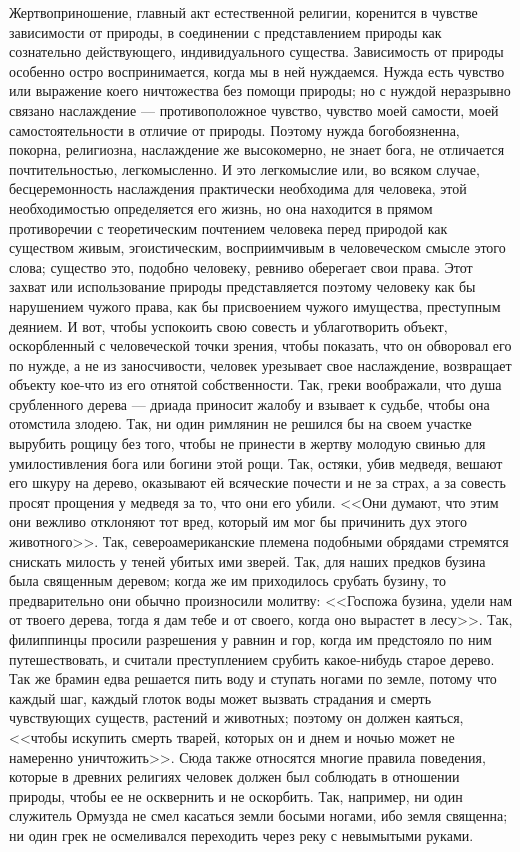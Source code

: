\documentclass[12pt,oneside]{book}
\begin{document}
Жертвоприношение, главный акт естественной религии, коренится в чувстве зависимости от природы, в соединении с представлением природы как сознательно действующего, индивидуального существа. Зависимость от природы особенно остро воспринимается, когда мы в ней нуждаемся. Нужда есть чувство или выражение коего ничтожества без помощи природы; но с нуждой неразрывно связано наслаждение --- противоположное чувство, чувство моей самости, моей самостоятельности в отличие от природы. Поэтому нужда богобоязненна, покорна, религиозна, наслаждение же высокомерно, не знает бога, не отличается почтительностью, легкомысленно. И это легкомыслие или, во всяком случае, бесцеремонность наслаждения практически необходима для человека, этой необходимостью определяется его жизнь, но она находится в прямом противоречии с теоретическим почтением человека перед природой как существом живым, эгоистическим, восприимчивым в человеческом смысле этого слова; существо это, подобно человеку, ревниво оберегает свои права. Этот захват или использование природы представляется поэтому человеку как бы нарушением чужого права, как бы присвоением чужого имущества, преступным деянием. И вот, чтобы успокоить свою совесть и ублаготворить объект, оскорбленный с человеческой точки зрения, чтобы показать, что он обворовал его по нужде, а не из заносчивости, человек урезывает свое наслаждение, возвращает объекту кое-что из его отнятой собственности. Так, греки воображали, что душа срубленного дерева --- дриада приносит жалобу и взывает к судьбе, чтобы она отомстила злодею. Так, ни один римлянин не решился бы на своем участке вырубить рощицу без того, чтобы не принести в жертву молодую свинью для умилостивления бога или богини этой рощи. Так, остяки, убив медведя, вешают его шкуру на дерево, оказывают ей всяческие почести и не за страх, а за совесть просят прощения у медведя за то, что они его убили. <<Они думают, что этим они вежливо отклоняют тот вред, который им мог бы причинить дух этого животного>>. Так, североамериканские племена подобными обрядами стремятся снискать милость у теней убитых ими зверей. Так, для наших предков бузина была священным деревом; когда же им приходилось срубать бузину, то предварительно они обычно произносили молитву: <<Госпожа бузина, удели нам от твоего дерева, тогда я дам тебе и от своего, когда оно вырастет в лесу>>. Так, филиппинцы просили разрешения у равнин и гор, когда им предстояло по ним путешествовать, и считали преступлением срубить какое-нибудь старое дерево. Так же брамин едва решается пить воду и ступать ногами по земле, потому что каждый шаг, каждый глоток воды может вызвать страдания и смерть чувствующих существ, растений и животных; поэтому он должен каяться, <<чтобы искупить смерть тварей, которых он и днем и ночью может не намеренно уничтожить>>. Сюда также относятся многие правила поведения, которые в древних религиях человек должен был соблюдать в отношении природы, чтобы ее не осквернить и не оскорбить. Так, например, ни один служитель Ормузда не смел касаться земли босыми ногами, ибо земля священна; ни один грек не осмеливался переходить через реку с невымытыми руками.
\end{document}
